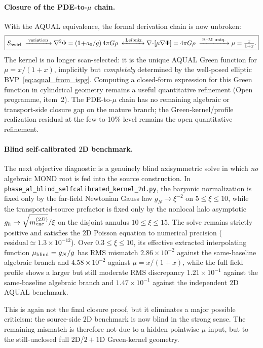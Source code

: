 \documentclass[11pt]{article}
\begin{document}
\paragraph{Closure of the PDE-to-$\mu$ chain.}
With the AQUAL equivalence, the formal derivation chain is now
unbroken:
\[
\boxed{
  S_{\rm swirl}
  \;\xrightarrow{\;\text{variation}\;}
  \nabla^2\Phi=(1\!+\!a_0/g)\,4\pi G\rho
  \;\xleftrightarrow{\;\text{Leibniz}\;}
  \nabla\!\cdot\![\mu\nabla\Phi]=4\pi G\rho
  \;\xrightarrow{\;\text{B--M uniq.}\;}
  \mu=\tfrac{x}{1+x}.
}
\]
The kernel is no longer scan-selected: it is the unique AQUAL Green
function for $\mu=x/(1+x)$, implicitly but \emph{completely}
determined by the well-posed elliptic BVP~\eqref{eq:aqual_from_ispg}.
Computing a closed-form expression for this Green function in
cylindrical geometry remains a useful quantitative refinement
(Open programme, item~2).  The PDE-to-$\mu$ chain has no remaining algebraic
or transport-side closure gap on the mature branch; the Green-kernel/profile
realization residual at the few-to-10\% level remains the open quantitative
refinement.

\paragraph{Blind self-calibrated $2$D benchmark.}
The next objective diagnostic is a genuinely blind axisymmetric solve in
which \emph{no} algebraic MOND root is fed into the source construction.
In \texttt{phase\_al\_blind\_selfcalibrated\_kernel\_2d.py}, the
baryonic normalization is fixed only by the far-field Newtonian Gauss
law
\(
g_N\to \xi^{-2}
\)
on $5\le\xi\le10$, while the transported-source prefactor is fixed only
by the nonlocal halo asymptotic
\(
g_h\to \sqrt{m_{\rm enc}^{(2D)}}/\xi
\)
on the disjoint annulus $10\le\xi\le15$.  The solve remains strictly
positive and satisfies the $2$D Poisson equation to numerical precision
($\mathrm{residual}\simeq 1.3\times10^{-12}$).  Over
$0.3\le\xi\le10$, its effective extracted interpolating function
$\mu_{\rm blind}=g_N/g$ has RMS mismatch
$2.86\times10^{-2}$ against the same-baseline algebraic branch and
$4.58\times10^{-2}$ against $\mu=x/(1+x)$, while the full field profile
shows a larger but still moderate RMS discrepancy
$1.21\times10^{-1}$ against the same-baseline algebraic branch and
$1.47\times10^{-1}$ against the independent $2$D AQUAL benchmark.

This is again not the final closure proof, but it eliminates a major
possible criticism: the source-side $2$D benchmark is now blind in the
strong sense.  The remaining mismatch is therefore not due to a hidden
pointwise $\mu$ input, but to the still-unclosed full $2$D/$2{+}1$D
Green-kernel geometry.
\end{document}
